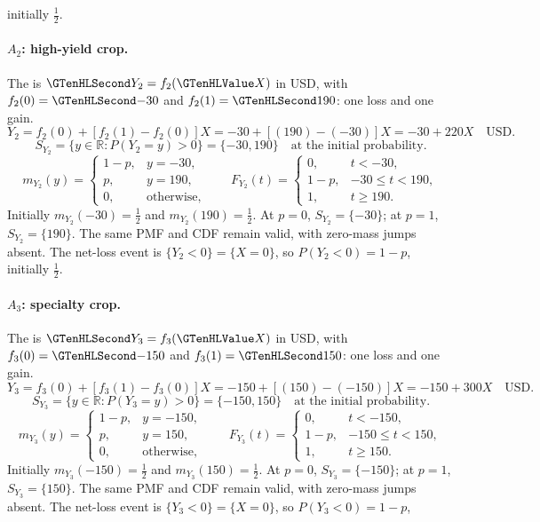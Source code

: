initially $\frac{1}{2}$.
\paragraph{$A_2$: high-yield crop.}
The  is $\Money{Y_2}=f_2(\Indicator{X})$ in USD,
with $f_2(0)=\Money{-30}$ and $f_2(1)=\Money{190}$: one loss and one gain.
\[
Y_2=f_2(0)+[f_2(1)-f_2(0)]X=-30+[(190)-(-30)]X=-30+220X\quad\text{USD}.
\]
\[S_{Y_2}=\{y\in\mathbb R:P(Y_2=y)>0\}=\{-30,190\}\quad\text{at the initial probability}.\]
\[
m_{Y_2}(y)=\begin{cases}1-p,&y=-30,\\p,&y=190,\\0,&\text{otherwise},\end{cases}
\qquad F_{Y_2}(t)=\begin{cases}0,&t<-30,\\1-p,&-30\leq t<190,\\1,&t\geq 190.\end{cases}
\]
Initially $m_{Y_2}(-30)=\frac{1}{2}$ and $m_{Y_2}(190)=\frac{1}{2}$.
At $p=0$, $S_{Y_2}=\{-30\}$; at $p=1$, $S_{Y_2}=\{190\}$.
The same PMF and CDF remain valid, with zero-mass jumps absent.
The net-loss event is $\{Y_2<0\}=\{X=0\}$, so $P(Y_2<0)=1-p$,
initially $\frac{1}{2}$.
\paragraph{$A_3$: specialty crop.}
The  is $\Money{Y_3}=f_3(\Indicator{X})$ in USD,
with $f_3(0)=\Money{-150}$ and $f_3(1)=\Money{150}$: one loss and one gain.
\[
Y_3=f_3(0)+[f_3(1)-f_3(0)]X=-150+[(150)-(-150)]X=-150+300X\quad\text{USD}.
\]
\[S_{Y_3}=\{y\in\mathbb R:P(Y_3=y)>0\}=\{-150,150\}\quad\text{at the initial probability}.\]
\[
m_{Y_3}(y)=\begin{cases}1-p,&y=-150,\\p,&y=150,\\0,&\text{otherwise},\end{cases}
\qquad F_{Y_3}(t)=\begin{cases}0,&t<-150,\\1-p,&-150\leq t<150,\\1,&t\geq 150.\end{cases}
\]
Initially $m_{Y_3}(-150)=\frac{1}{2}$ and $m_{Y_3}(150)=\frac{1}{2}$.
At $p=0$, $S_{Y_3}=\{-150\}$; at $p=1$, $S_{Y_3}=\{150\}$.
The same PMF and CDF remain valid, with zero-mass jumps absent.
The net-loss event is $\{Y_3<0\}=\{X=0\}$, so $P(Y_3<0)=1-p$,
